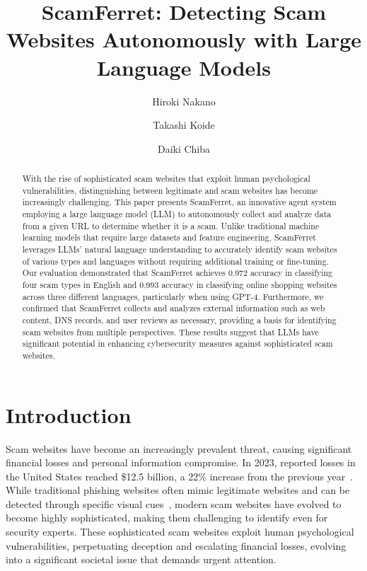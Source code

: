 \documentclass[runningheads]{llncs}
\begin{document}
\title{ScamFerret: Detecting Scam Websites Autonomously with Large Language Models}
\author{Hiroki Nakano \and 
Takashi Koide \and
Daiki Chiba}
\maketitle              %
\begin{abstract}
With the rise of sophisticated scam websites that exploit human psychological vulnerabilities, distinguishing between legitimate and scam websites has become increasingly challenging.
This paper presents ScamFerret, an innovative agent system employing a large language model (LLM) to autonomously collect and analyze data from a given URL to determine whether it is a scam.
Unlike traditional machine learning models that require large datasets and feature engineering, ScamFerret leverages LLMs' natural language understanding to accurately identify scam websites of various types and languages without requiring additional training or fine-tuning.
Our evaluation demonstrated that ScamFerret achieves 0.972 accuracy in classifying four scam types in English and 0.993 accuracy in classifying online shopping websites across three different languages, particularly when using GPT-4.
Furthermore, we confirmed that ScamFerret collects and analyzes external information such as web content, DNS records, and user reviews as necessary, providing a basis for identifying scam websites from multiple perspectives.
These results suggest that LLMs have significant potential in enhancing cybersecurity measures against sophisticated scam websites.
\end{abstract}
\section{Introduction}
Scam websites have become an increasingly prevalent threat, causing significant financial losses and personal information compromise.
In 2023, reported losses in the United States reached \$12.5 billion, a 22\% increase from the previous year~\cite{fbi_report}.
While traditional phishing websites often mimic legitimate websites and can be detected through specific visual cues~\cite{DBLP:conf/uss/LinLDNCLSZD21,DBLP:conf/IEEEares/DooremaalBAZ21}, modern scam websites have evolved to become highly sophisticated, making them challenging to identify even for security experts.
These sophisticated scam websites exploit human psychological vulnerabilities, perpetuating deception and escalating financial losses, evolving into a significant societal issue that demands urgent attention.
\end{document}
